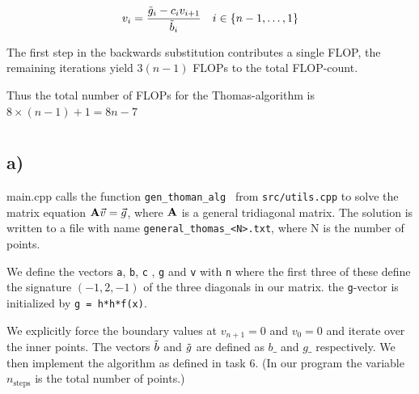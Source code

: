 \documentclass[a4paper,10pt,english]{article}
\begin{document}
\begin{equation}
  v_i = \frac{\Tilde{g}_i - c_iv_{i+1}}{\Tilde{b}_i} \quad i \in \{n-1, \dots, 1\}
  \label{eq_gen_algo_V}
\end{equation}

The first step in the backwards substitution contributes a single FLOP, the
remaining iterations yield $3(n-1)$ FLOPs to the total FLOP-count.

Thus the total number of FLOPs for the Thomas-algorithm is $8 \times (n-1) + 1 = 8n - 7$

\section{} %
\subsection{a)}
main.cpp calls the function  \verb|gen_thoman_alg | from \verb|src/utils.cpp| to solve the
matrix equation $\bold{A}\vec{v} = \vec{g}$, where $\bold{A}$ is a general tridiagonal matrix.
The solution is written to a file with name \verb|general_thomas_<N>.txt|, where N is the number of points.

We define the vectors \verb|a|, \verb|b|, \verb|c| , \verb|g| and \verb|v| with \verb|n| where the first three of these define the signature $(-1, 2, -1)$ of the three diagonals in our matrix. the \verb|g|-vector is initialized by \verb|g = h*h*f(x)|.

We explicitly force the boundary values at $v_{n + 1} = 0$ 
and $v_0 = 0$ and iterate over the inner points. The vectors 
$\Tilde{b}$ and $\Tilde{g}$ are defined as 
$b\_$ and $g\_$ respectively. 
We then implement the algorithm as defined in task 6. (In our program
 the variable $n_{\text{steps}}$ is the total number of points.)
\end{document}
